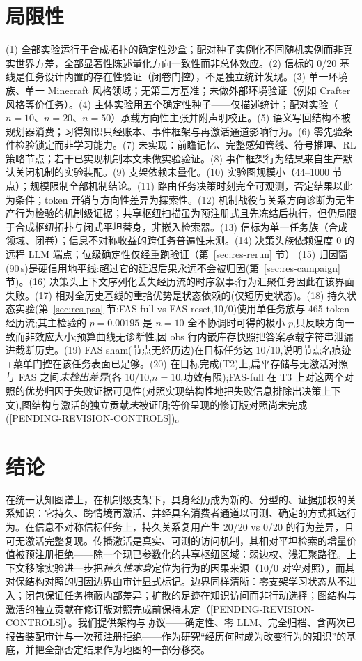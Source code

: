 \documentclass[10pt,a4paper]{ctexart}
\begin{document}
\section{局限性}
\label{sec:limits}
(1) 全部实验运行于合成拓扑的确定性沙盒；配对种子实例化不同随机实例而非真实世界方差，全部显著性陈述量化方向一致性而非总体效应。(2) 信标的 0/20 基线是任务设计内置的存在性验证（闭卷门控），不是独立统计发现。(3) 单一环境族、单一 Minecraft 风格领域；无第三方基准；未做外部环境验证（例如 Crafter 风格等价任务）。(4) 主体实验用五个确定性种子——仅描述统计；配对实验（$n{=}10$、$n{=}20$、$n{=}50$）承载方向性主张并附声明校正。(5) 语义写回结构不被规划器消费；习得知识只经账本、事件框架与再激活通道影响行为。(6) 零先验条件检验锁定而非学习能力。(7) 未实现：前瞻记忆、完整感知管线、符号推理、RL 策略节点；若干已实现机制本文未做实验验证。(8) 事件框架行为结果来自生产默认关闭机制的实验装配。(9) 支架依赖未量化。(10) 实验图规模小（44--1000 节点）；规模限制全部机制结论。(11) 路由任务决策时刻完全可观测，否定结果以此为条件；token 开销与方向性差异为探索性。(12) 机制战役与关系方向诊断为无生产行为检验的机制级证据；共享枢纽扫描虽为预注册式且先冻结后执行，但仍局限于合成枢纽拓扑与闭式平坦替身，非嵌入检索器。(13) 信标为单一任务族（合成领域、闭卷）；信息不对称收益的跨任务普遍性未测。(14) 决策头族依赖温度 0 的远程 LLM 端点；位级确定性仅经重跑验证（第~\ref{sec:res-rerun} 节） (15) 归因窗(90\,s)是硬信用地平线:超过它的延迟后果永远不会被归因(第~\ref{sec:res-campaign} 节)。(16) 决策头上下文序列化丢失经历流的时序叙事;行为汇聚任务因此在该界面失败。(17) 相对全历史基线的重拾优势是状态依赖的(仅短历史状态)。(18) 持久状态实验(第~\ref{sec:res-psa} 节;FAS-full vs FAS-reset,10/0)使用单任务族与 465-token 经历流;其主检验的 $p{=}0.00195$ 是 $n{=}10$ 全不协调时可得的极小 $p$,只反映方向一致而非效应大小;预算曲线无诊断性,因 obs 行内嵌库存快照把答案承载字符串泄漏进截断历史。(19) FAS-sham(节点无经历边)在目标任务达 10/10,说明节点名痕迹+菜单门控在该任务表面已足够。(20) 在目标完成(T2)上,扁平存储与无激活对照与 FAS 之间\emph{未检出差异}(各 10/10,$n{=}10$,功效有限);FAS-full 在 T3 上对这两个对照的优势归因于失败证据可见性(对照实现结构性地把失败信息排除出决策上下文),图结构与激活的独立贡献\emph{未}被证明;等价呈现的修订版对照尚未完成([PENDING-REVISION-CONTROLS])。

\section{结论}
在统一认知图谱上，在机制级支架下，具身经历成为新的、分型的、证据加权的关系知识：它持久、跨情境再激活、并经具名消费者通道以可测、确定的方式抵达行为。在信息不对称信标任务上，持久关系复用产生 20/20 vs 0/20 的行为差异，且可无激活完整复现。传播激活是真实、可测的访问机制，其相对平坦检索的增量价值被预注册拒绝——除一个现已参数化的共享枢纽区域：弱边权、浅汇聚路径。上下文移除实验进一步把\emph{持久性本身}定位为行为的因果来源（10/0 对空对照），而其对保结构对照的归因边界由审计显式标记。边界同样清晰：零支架学习状态从不进入；闭包保证任务掩蔽内部差异；扩散的足迹在知识访问而非行动选择；图结构与激活的独立贡献在修订版对照完成前保持未定（[PENDING-REVISION-CONTROLS]）。我们提供架构与协议——确定性、零 LLM、完全归档、含两次已报告装配审计与一次预注册拒绝——作为研究“经历何时成为改变行为的知识”的基底，并把全部否定结果作为地图的一部分移交。
\end{document}

